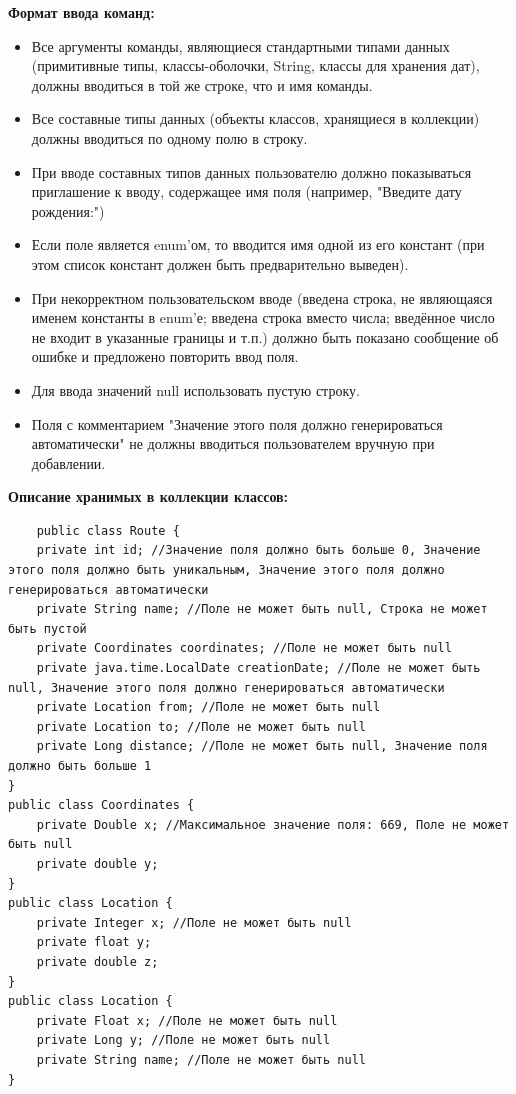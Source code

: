\documentclass[12pt,onecolumn]{article}
\begin{document}
\textbf{Формат ввода команд:}
\begin{itemize}
    \item Все аргументы команды, являющиеся стандартными типами данных (примитивные типы, классы-оболочки, String, классы для хранения дат), должны вводиться в той же строке, что и имя команды.
    \item Все составные типы данных (объекты классов, хранящиеся в коллекции) должны вводиться по одному полю в строку.
    \item При вводе составных типов данных пользователю должно показываться приглашение к вводу, содержащее имя поля (например, "Введите дату рождения:")
    \item Если поле является enum'ом, то вводится имя одной из его констант (при этом список констант должен быть предварительно выведен).
    \item При некорректном пользовательском вводе (введена строка, не являющаяся именем константы в enum'е; введена строка вместо числа; введённое число не входит в указанные границы и т.п.) должно быть показано сообщение об ошибке и предложено повторить ввод поля.
    \item Для ввода значений null использовать пустую строку.
    \item Поля с комментарием "Значение этого поля должно генерироваться автоматически" не должны вводиться пользователем вручную при добавлении.
\end{itemize}
\textbf{Описание хранимых в коллекции классов:}
\begin{verbatim}
    public class Route {
    private int id; //Значение поля должно быть больше 0, Значение этого поля должно быть уникальным, Значение этого поля должно генерироваться автоматически
    private String name; //Поле не может быть null, Строка не может быть пустой
    private Coordinates coordinates; //Поле не может быть null
    private java.time.LocalDate creationDate; //Поле не может быть null, Значение этого поля должно генерироваться автоматически
    private Location from; //Поле не может быть null
    private Location to; //Поле не может быть null
    private Long distance; //Поле не может быть null, Значение поля должно быть больше 1
}
public class Coordinates {
    private Double x; //Максимальное значение поля: 669, Поле не может быть null
    private double y;
}
public class Location {
    private Integer x; //Поле не может быть null
    private float y;
    private double z;
}
public class Location {
    private Float x; //Поле не может быть null
    private Long y; //Поле не может быть null
    private String name; //Поле не может быть null
}
\end{verbatim}
\newpage
\end{document}
